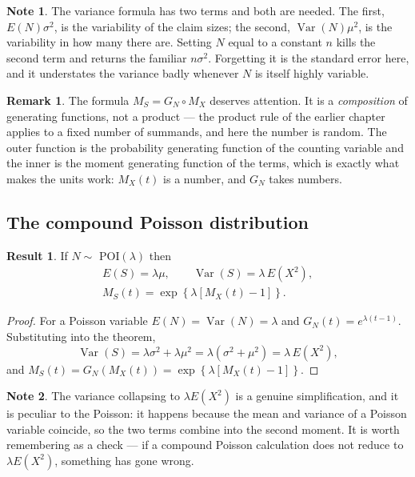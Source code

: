 \documentclass[11pt,a4paper]{article}
\theoremstyle{definition}
\newtheorem{result}[thm]{Result}
\newtheorem*{note}{Note}
\newtheorem*{remark}{Remark}
\DeclareMathOperator{\Var}{Var}
\begin{document}
\begin{note}
The variance formula has two terms and both are needed. The first,
$E(N)\sigma^{2}$, is the variability of the claim sizes; the second,
$\Var(N)\mu^{2}$, is the variability in how many there are. Setting $N$ equal to
a constant $n$ kills the second term and returns the familiar $n\sigma^{2}$.
Forgetting it is the standard error here, and it understates the variance badly
whenever $N$ is itself highly variable.
\end{note}

\begin{remark}
The formula $M_S = G_N \circ M_X$ deserves attention. It is a \emph{composition}
of generating functions, not a product --- the product rule of the earlier
chapter applies to a fixed number of summands, and here the number is random.
The outer function is the probability generating function of the counting
variable and the inner is the moment generating function of the terms, which is
exactly what makes the units work: $M_X(t)$ is a number, and $G_N$ takes
numbers.
\end{remark}

\subsection{The compound Poisson distribution}

\begin{result}
If $N\sim$ POI$(\lambda)$ then
\begin{gather*}
E(S) = \lambda\mu,\qquad \Var(S) = \lambda\,E\left(X^{2}\right), \\
M_S(t) = \exp\left\{\lambda\left[M_X(t)-1\right]\right\}.
\end{gather*}
\end{result}

\begin{proof}
For a Poisson variable $E(N)=\Var(N)=\lambda$ and
$G_N(t)=e^{\lambda(t-1)}$. Substituting into the theorem,
$$\Var(S) = \lambda\sigma^{2} + \lambda\mu^{2}
= \lambda\left(\sigma^{2}+\mu^{2}\right) = \lambda\,E\left(X^{2}\right),$$
and $M_S(t) = G_N\left(M_X(t)\right) = \exp\left\{\lambda\left[M_X(t)-1\right]\right\}$.
\end{proof}

\begin{note}
The variance collapsing to $\lambda E\left(X^{2}\right)$ is a genuine
simplification, and it is peculiar to the Poisson: it happens because the mean
and variance of a Poisson variable coincide, so the two terms combine into the
second moment. It is worth remembering as a check --- if a compound Poisson
calculation does not reduce to $\lambda E\left(X^{2}\right)$, something has gone
wrong.
\end{note}
\end{document}
